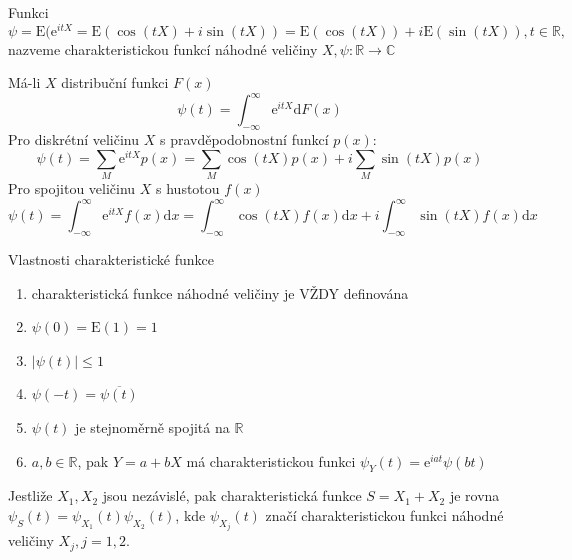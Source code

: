 \begin{definition}
Funkci \begin{equation}
\psi =\mathrm{E}(\mathrm{e}^{itX}=\mathrm{E}(\cos(tX)+i\sin(tX))=\mathrm{E}(\cos(tX))+i\mathrm{E}(\sin(tX)), t\in \mathbb{R},
\end{equation}
nazveme charakteristickou funkcí náhodné veličiny $X,\psi:\mathbb{R}\rightarrow\mathbb{C}$
\end{definition}

\begin{notes}
Má-li $X$ distribuční funkci $F(x)$
\begin{equation}
\psi(t)=\int_{-\infty}^{\infty}\mathrm{e}^{itX} \mathrm{d}F(x)
\end{equation}
Pro diskrétní veličinu $X$ s pravděpodobnostní funkcí $p(x)$:
\begin{equation}
\psi(t)=\sum_M \mathrm{e}^{itX}p(x)=\sum_M\cos(tX)p(x)+i\sum_M\sin(tX)p(x)
\end{equation}
Pro spojitou veličinu $X$ s hustotou $f(x)$\begin{equation}
\psi(t)=\int_{-\infty}^{\infty}\mathrm{e}^{itX}f(x) \mathrm{d}x =\int_{-\infty}^{\infty}\cos(tX) f(x) \mathrm{d}x+i\int_{-\infty}^{\infty}\sin(tX) f(x) \mathrm{d}x
\end{equation}
\end{notes}


\begin{theorem}
Vlastnosti charakteristické funkce
\begin{enumerate}
\item charakteristická funkce náhodné veličiny je VŽDY definována
\item $\psi(0)=\mathrm{E}(1)=1$
\item $|\psi(t)| \leq 1$
\item $\psi(-t)=\overline{\psi(t)}$
\item $\psi(t)$ je stejnoměrně spojitá na $\mathbb{R}$
\item $a,b \in \mathbb{R}$, pak $Y=a+bX$ má charakteristickou funkci $\psi_Y(t)=\mathrm{e}^{iat}\psi(bt)$
\end{enumerate}
\end{theorem}

\begin{theorem}
Jestliže $X_1,X_2$ jsou nezávislé, pak charakteristická funkce $S=X_1+X_2$ je rovna $\psi_S(t)=\psi_{X_1}(t)\psi_{X_2}(t)$, kde $\psi_{X_j}(t)$ značí charakteristickou funkci náhodné veličiny $X_j, j=1,2.$
\end{theorem}

